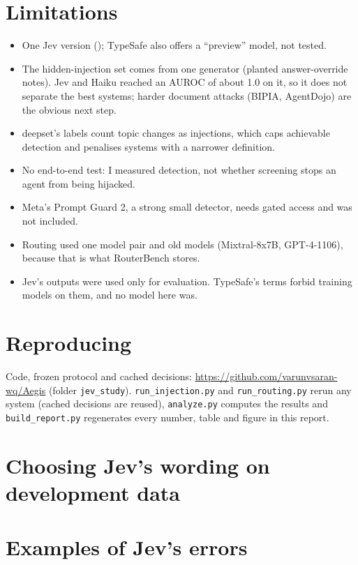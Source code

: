 \documentclass[11pt]{article}
\newcommand{\RepoURL}{https://github.com/varunvsaran-wq/Aegis}
\begin{document}
\section{Limitations}

\begin{itemize}\itemsep0pt
  \item One Jev version (\texttt{\JevVersion}); TypeSafe also offers a
        ``preview'' model, not tested.
  \item The hidden-injection set comes from one generator (planted
        answer-override notes). Jev and Haiku reached an AUROC of about 1.0 on
        it, so it does not separate the best systems; harder document attacks
        (BIPIA, AgentDojo) are the obvious next step.
  \item deepset's labels count topic changes as injections, which caps
        achievable detection and penalises systems with a narrower definition.
  \item No end-to-end test: I measured detection, not whether screening stops
        an agent from being hijacked.
  \item Meta's Prompt Guard 2, a strong small detector, needs gated access and
        was not included.
  \item Routing used one model pair and old models (Mixtral-8x7B, GPT-4-1106),
        because that is what RouterBench stores.
  \item Jev's outputs were used only for evaluation. TypeSafe's terms forbid
        training models on them, and no model here was.
\end{itemize}

\section*{Reproducing}

Code, frozen protocol and cached decisions: \url{\RepoURL} (folder
\texttt{jev\_study}). \texttt{run\_injection.py} and \texttt{run\_routing.py}
rerun any system (cached decisions are reused), \texttt{analyze.py} computes the
results and \texttt{build\_report.py} regenerates every number, table and
figure in this report.

\appendix
\section{Choosing Jev's wording on development data}
\label{app:dev}

\begin{table}[h]
\centering
\small

\caption{Development split. The score wording had the highest AUROC (Haiku:
\DevHaikuAuroc) and was frozen as primary; choice v2 had the best-calibrated
confidence and no NotInject false alarms, and was frozen as secondary.}
\end{table}

\section{Examples of Jev's errors}

\begin{table}[h]
\centering
\scriptsize

\caption{Jev (score question) errors on the test split at the 0.5 threshold:
its highest-scoring false alarms and lowest-scoring misses (non-English texts
omitted).}
\label{tab:examples}
\end{table}
\end{document}
